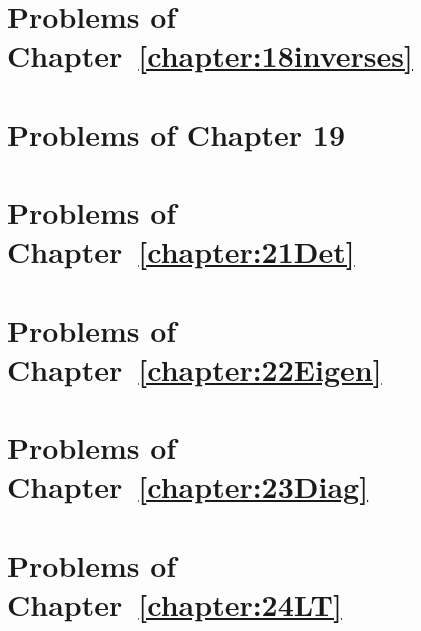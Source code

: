\section*{Problems of Chapter~\ref{chapter:18inverses}}

  

\section*{Problems of Chapter 19}

 

\section*{Problems of Chapter~\ref{chapter:21Det}}


\section*{Problems of Chapter~\ref{chapter:22Eigen}}


\section*{Problems of Chapter~\ref{chapter:23Diag}}\label{sol:23}

 

\section*{Problems of Chapter~\ref{chapter:24LT}}\label{sol:24}







